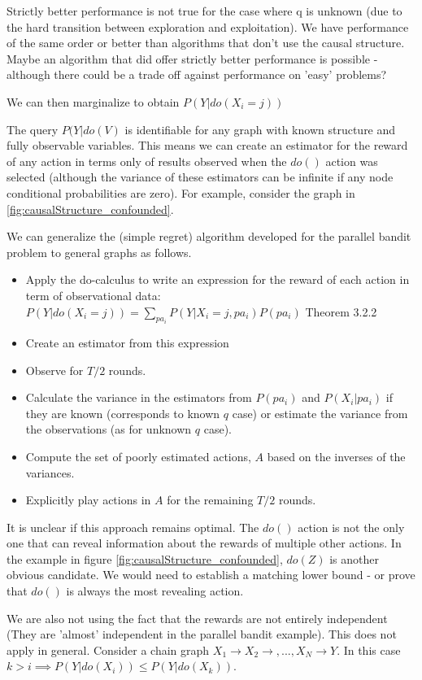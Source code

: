 Strictly better performance is not true for the case where q is unknown (due to the hard transition between exploration and exploitation). We have performance of the same order or better than algorithms that don't use the causal structure. Maybe an algorithm that did offer strictly better performance is possible - although there could be a trade off against performance on 'easy' problems?  

We can then marginalize to obtain $P(Y|do(X_i = j))$


The query $P(Y|do(V)$ is identifiable for any graph with known structure and fully observable variables. This means we can create an estimator for the reward of any action in terms only of results observed when the $do()$ action was selected (although the variance of these estimators can be infinite if any node conditional probabilities are zero). For example, consider the graph in \cref{fig:causalStructure_confounded}. 

We can generalize the (simple regret) algorithm developed for the parallel bandit problem to general graphs as follows. 


\begin{itemize}
\item Apply the do-calculus to write an expression for the reward of each action in term of observational data: $P(Y|do(X_i=j)) = \sum_{pa_i} P(Y|X_i = j,pa_i)P(pa_i)$ \cite{Pearl2000} Theorem 3.2.2
\item Create an estimator from this expression
\item Observe for $T/2$ rounds.
\item Calculate the variance in the estimators from $P(pa_i)$ and $P(X_i|pa_i)$ if they are known (corresponds to known $q$ case) or estimate the variance from the observations (as for unknown $q$ case). 
\item Compute the set of poorly estimated actions, $A$ based on the inverses of the variances.
\item Explicitly play actions in $A$ for the remaining $T/2$ rounds.
\end{itemize}

It is unclear if this approach remains optimal. The $do()$ action is not the only one that can reveal information about the rewards of multiple other actions. In the example in figure \ref{fig:causalStructure_confounded}, $do(Z)$ is another obvious candidate. We would need to establish a matching lower bound - or prove that $do()$ is always the most revealing action. 

We are also not using the fact that the rewards are not entirely independent (They are 'almost' independent in the parallel bandit example). This does not apply in general. Consider a chain graph $X_1 \rightarrow X_2 \rightarrow, ..., X_N \rightarrow Y$. In this case $k > i \implies P(Y|do(X_i)) \leq P(Y|do(X_k))$.  